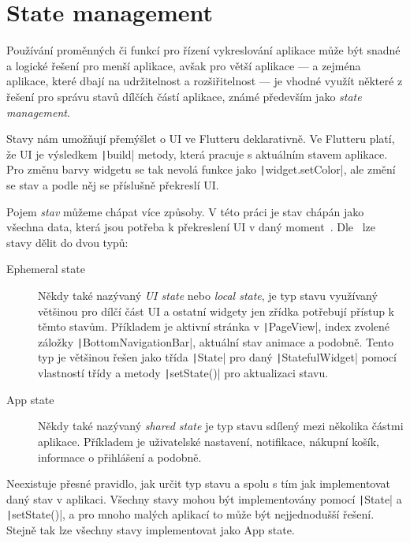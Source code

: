 \section{State management}

Používání proměnných či funkcí pro řízení vykreslování aplikace může být
snadné a logické řešení pro menší aplikace,
avšak pro větší aplikace
--- a zejména aplikace, které dbají na udržitelnost a rozšiřitelnost ---
je vhodné využít některé z řešení pro správu stavů dílčích částí aplikace,
známé především jako \emph{state management}.

Stavy nám umožňují přemýšlet o UI ve Flutteru deklarativně.
Ve Flutteru platí,
že UI je výsledkem \texttt|build| metody,
která pracuje s aktuálním stavem aplikace.
Pro změnu barvy widgetu se tak nevolá funkce jako
\texttt|widget.setColor|,
ale změní se stav a podle něj se příslušně
překreslí UI.~\cite{flutter_state_mgmt_declarative}

Pojem \emph{stav} můžeme chápat více způsoby.
V této práci je stav chápán jako všechna data,
která jsou potřeba k překreslení UI
v daný moment~\cite{flutter_state_mgmt_ephemeral_vs_app}.
Dle~\cite{flutter_state_mgmt_ephemeral_vs_app} lze stavy dělit do dvou typů:

\begin{description}
    \item[Ephemeral state] Někdy také nazývaný \emph{UI state} nebo
    \emph{local state},
    je typ stavu využívaný většinou pro dílčí část UI
    a ostatní widgety jen zřídka potřebují přístup k těmto stavům.
    Příkladem je aktivní stránka v \texttt|PageView|,
    index zvolené záložky \texttt|BottomNavigationBar|,
    aktuální stav animace a podobně.
    Tento typ je většinou řešen jako třída \texttt|State| pro daný
    \texttt|StatefulWidget| pomocí vlastností třídy a metody
    \texttt|setState()| pro aktualizaci stavu.
    \item[App state] Někdy také nazývaný \emph{shared state} je typ stavu
    sdílený mezi několika částmi aplikace.
    Příkladem je uživatelské nastavení, notifikace, nákupní košík,
    informace o přihlášení a podobně.
\end{description}

Neexistuje přesné pravidlo,
jak určit typ stavu a spolu s tím jak implementovat daný stav v aplikaci.
Všechny stavy mohou být implementovány pomocí \texttt|State| a
\texttt|setState()|,
a pro mnoho malých aplikací to může být nejjednodušší řešení.
Stejně tak lze všechny stavy implementovat jako
App state.~\cite{flutter_state_mgmt_ephemeral_vs_app}

